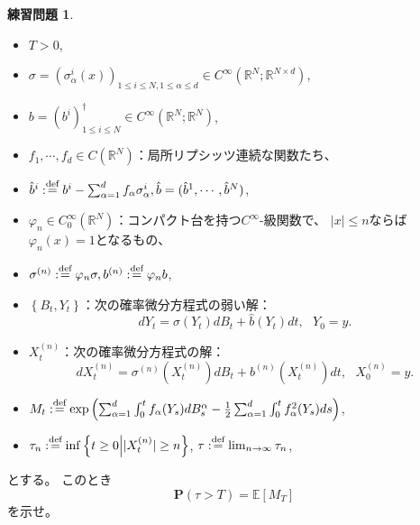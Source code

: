 \documentclass[uplatex]{jsarticle}
\theoremstyle{definition}
\newtheorem{prob}[prob]{練習問題}
\def\R{\mathbb{R}}
\def\P{\mathbf{P}}
\def\E{\mathbb{E}}
\def\dfn{:\overset{\mbox{{\scriptsize def}}}{=}}
\begin{document}
\begin{prob}\label{prob: 6.4}
  \
  \begin{itemize}
    \item
    \(T > 0\),
    \item
    \(\sigma = (\sigma_\alpha^i(x))_{1\leq i \leq N, 1\leq \alpha \leq d}\in
    C^\infty(\R^N;\R^{N\times d})\),
    \item
    \(b = (b^i)_{1\leq i\leq N}^\dagger \in C^\infty(\R^N;\R^N)\),
    \item
    \(f_1,\cdots, f_d\in C(\R^N)\)：局所リプシッツ連続な関数たち、
    \item
    \(\hat{b}^i \dfn b^i - \sum_{\alpha=1}^d f_\alpha \sigma_\alpha^i,
    \hat{b} = (\hat{b}^1,\cdots, \hat{b}^N)\),
    \item
    \(\varphi_n\in C_0^\infty(\R^N)\)：コンパクト台を持つ\(C^\infty\)-級関数で、
    \(|x| \leq n\)ならば\(\varphi_n(x) = 1\)となるもの、
    \item
    \(\sigma^{(n)}\dfn \varphi_n\sigma, b^{(n)}\dfn \varphi_n b\),
    \item
    \(\left\{ B_t, Y_t\right\}\)：次の確率微分方程式の弱い解：
    \[
    dY_t = \sigma(Y_t)dB_t + \hat{b}(Y_t)dt, \ \ \ Y_0 = y.
    \]
    \item
    \(X_t^{(n)}\)：次の確率微分方程式の解：
    \[
    dX_t^{(n)} = \sigma^{(n)}(X_t^{(n)}) dB_t + b^{(n)}(X_t^{(n)})dt,
    \ \ \ X_0^{(n)}=y.
    \]
    \item
    \(M_t \dfn \exp \left(
    \sum_{\alpha=1}^d \int_0^t f_\alpha(Y_s) dB_s^\alpha
    - \frac{1}{2}\sum_{\alpha=1}^d\int_0^tf_\alpha^2(Y_s)ds \right)\),
    \item
    \(\tau_n \dfn \inf\left\{ t\geq 0\middle| |X_t^{(n)}| \geq n \right\}\),
    \(\tau \dfn \lim_{n\to \infty}\tau_n\),
  \end{itemize}
  とする。
  このとき
  \[
  \P(\tau > T) = \E \left[ M_T \right]
  \]
  を示せ。
\end{prob}
\end{document}
